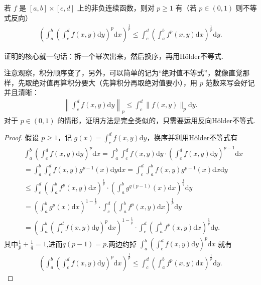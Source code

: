 \documentclass[../../main.tex]{subfiles}
\begin{document}
\begin{theorem}[Minkowski不等式]\label{theorem:Minkowski(闵可夫斯基)不等式}
若 $f$ 是 $[a,b] \times [c,d]$ 上的非负连续函数，则对 $p \geqslant 1$ 有（若 $p \in (0,1)$ 则不等式反向）
\begin{align*}
\left( \int_a^b \left( \int_c^d f(x,y) \mathrm{d}y \right)^p \mathrm{d}x \right)^{\frac{1}{p}} \leqslant \int_c^d \left( \int_a^b f^p(x,y) \mathrm{d}x \right)^{\frac{1}{p}} \mathrm{d}y.
\end{align*}
\end{theorem}
\begin{note}
证明的核心就一句话：拆一个幂次出来，然后换序，再用Hölder不等式.
\end{note}
\begin{remark}
注意观察，积分顺序变了，另外，可以简单的记为“绝对值不等式”，就像直觉那样，先取绝对值再算积分要大（先算积分再取绝对值要小），用 $p$ 范数来写会好记并且清晰：
\begin{align*}
\left\| \int_c^d f(x,y) \mathrm{d}y \right\|_p \leqslant  \int_c^d \|f(x,y)\|_p \mathrm{d}y.
\end{align*}
对于 $p \in (0,1)$ 的情形，证明方法是完全类似的，只需要运用反向Hölder不等式.
\end{remark}
\begin{proof}
假设 $p \geqslant  1$，记 $g(x) = \int_c^d f(x,y) \mathrm{d}y$，换序并利用\hyperref[theorem:Hölder(赫尔德)不等式(积分形式)]{Hölder不等式}有
\begin{align*}
&\int_a^b \left( \int_c^d f(x,y) \mathrm{d}y \right)^p \mathrm{d}x = \int_a^b \int_c^d f(x,y) \mathrm{d}y \cdot \left( \int_c^d f(x,y) \mathrm{d}y \right)^{p-1} \mathrm{d}x
\\
&= \int_a^b \int_c^d f(x,y) g^{p-1}(x) \mathrm{d}y \mathrm{d}x = \int_c^d \int_a^b f(x,y) g^{p-1}(x) \mathrm{d}x \mathrm{d}y
\\
&\leqslant \int_c^d \left( \int_a^b f^p(x,y) \mathrm{d}x \right)^{\frac{1}{p}} \cdot \left( \int_a^b g^{q(p-1)}(x) \mathrm{d}x \right)^{\frac{1}{q}} \mathrm{d}y
\\
&= \left( \int_a^b g^p(x) \mathrm{d}x \right)^{1-\frac{1}{p}} \cdot \int_c^d \left( \int_a^b f^p(x,y) \mathrm{d}x \right)^{\frac{1}{p}} \mathrm{d}y
\\
&= \left( \int_a^b \left( \int_c^d f(x,y) \mathrm{d}y \right)^p \mathrm{d}x \right)^{1-\frac{1}{p}} \cdot \int_c^d \left( \int_a^b f^p(x,y) \mathrm{d}x \right)^{\frac{1}{p}} \mathrm{d}y.
\end{align*}
其中$\frac{1}{p}+\frac{1}{q}=1$,进而$q(p-1)=p$.两边约掉 $\int_a^b \left( \int_c^d f(x,y) \mathrm{d}y \right)^p \mathrm{d}x$ 就有
\begin{align*}
\left( \int_a^b \left( \int_c^d f(x,y) \mathrm{d}y \right)^p \mathrm{d}x \right)^{\frac{1}{p}} \leqslant \int_c^d \left( \int_a^b f^p(x,y) \mathrm{d}x \right)^{\frac{1}{p}} \mathrm{d}y.
\end{align*}

\end{proof}
\end{document}
